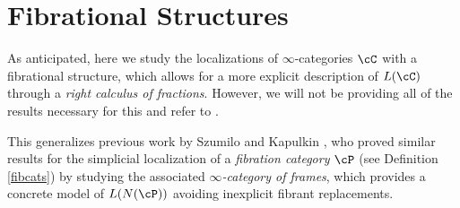 





\section{Fibrational Structures}

As anticipated, here we study the localizations of $\infty$-categories $\cC$
with a fibrational structure, which allows for a more explicit
description of $L(\cC)$ through a \emph{right calculus of fractions}. However,
we will not be providing all of the results necessary
for this and refer to \cite[Ch.\ 7.2-7.4]{Cis19}.

\noindent
This generalizes
previous work by Szumilo and Kapulkin \cite{Szu14,KS15}, who proved
similar results for the simplicial localization of a \emph{fibration category}
$\cP$ (see Definition \ref{fibcats})
by studying the associated \emph{$\infty$-category of frames}, which provides
a concrete model of $L(N(\cP))$ avoiding inexplicit fibrant replacements.

